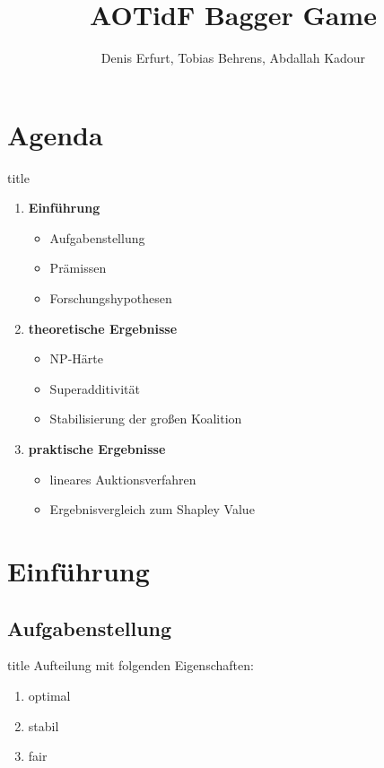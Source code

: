 \documentclass[c]{beamer}
\title[] {AOTidF Bagger Game}
\author[Denis Erfurt, Tobias Behrens, Abdallah Kadour]{Denis Erfurt, Tobias Behrens, Abdallah Kadour}
\theoremstyle{break}
\begin{document}
  \frame{\titlepage} %

  \section*{Agenda}
  \begin{frame}{title} %
    \begin{enumerate}
      \item \textbf{Einführung}
      \begin{itemize}
        \item Aufgabenstellung
        \item Prämissen
        \item Forschungshypothesen
      \end{itemize}
      \item \textbf{theoretische Ergebnisse}
      \begin{itemize}
        \item NP-Härte
        \item Superadditivität
        \item Stabilisierung der großen Koalition
      \end{itemize}
      \item \textbf{praktische Ergebnisse}
      \begin{itemize}
        \item lineares Auktionsverfahren
        \item Ergebnisvergleich zum Shapley Value
      \end{itemize}
    \end{enumerate}
  \end{frame}


  \section*{Einführung}
  \subsection*{Aufgabenstellung}
  \begin{frame}{title} %
    Aufteilung mit folgenden Eigenschaften:
    \begin{enumerate}
      \item optimal
      \item stabil
      \item fair
    \end{enumerate}
  \end{frame}
\end{document}
